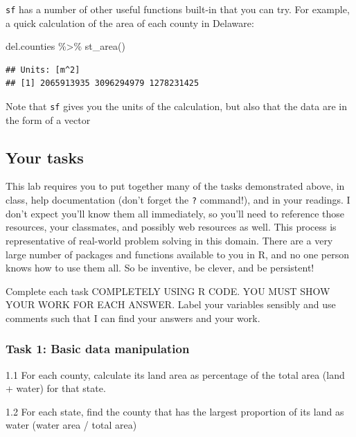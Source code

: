 \documentclass[]{article}
\newenvironment{Shaded}{\begin{snugshade}}{\end{snugshade}}
\newcommand{\FunctionTok}[1]{\textcolor[rgb]{0.00,0.00,0.00}{#1}}
\newcommand{\NormalTok}[1]{#1}
\newcommand{\SpecialCharTok}[1]{\textcolor[rgb]{0.00,0.00,0.00}{#1}}
\begin{document}
\texttt{sf} has a number of other useful functions built-in that you can
try. For example, a quick calculation of the area of each county in
Delaware:

\begin{Shaded}
\begin{Highlighting}[]
\NormalTok{del.counties }\SpecialCharTok{\%\textgreater{}\%} \FunctionTok{st\_area}\NormalTok{() }
\end{Highlighting}
\end{Shaded}

\begin{verbatim}
## Units: [m^2]
## [1] 2065913935 3096294979 1278231425
\end{verbatim}

Note that \texttt{sf} gives you the units of the calculation, but also
that the data are in the form of a vector

\hypertarget{your-tasks}{%
\subsection{Your tasks}\label{your-tasks}}

This lab requires you to put together many of the tasks demonstrated
above, in class, help documentation (don't forget the \texttt{?}
command!), and in your readings. I don't expect you'll know them all
immediately, so you'll need to reference those resources, your
classmates, and possibly web resources as well. This process is
representative of real-world problem solving in this domain. There are a
very large number of packages and functions available to you in R, and
no one person knows how to use them all. So be inventive, be clever, and
be persistent!

Complete each task COMPLETELY USING R CODE. YOU MUST SHOW YOUR WORK FOR
EACH ANSWER. Label your variables sensibly and use comments such that I
can find your answers and your work.

\hypertarget{task-1-basic-data-manipulation}{%
\subsubsection{Task 1: Basic data
manipulation}\label{task-1-basic-data-manipulation}}

1.1 For each county, calculate its land area as percentage of the total
area (land + water) for that state.

1.2 For each state, find the county that has the largest proportion of
its land as water (water area / total area)
\end{document}
